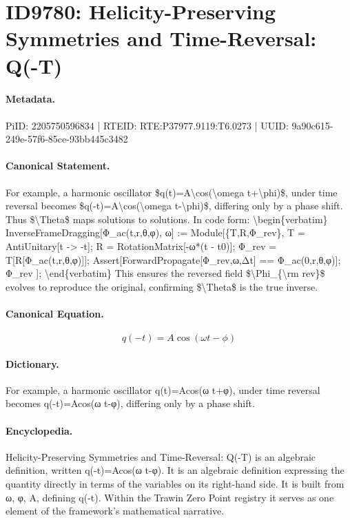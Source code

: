 \section*{ID9780: Helicity-Preserving Symmetries and Time-Reversal: Q(-T)}
\paragraph{Metadata.}
PiID: 2205750596834 | RTEID: RTE:P37977.9119:T6.0273 | UUID: 9a90c615-249e-57f6-85ce-93bb445c3482

\paragraph{Canonical Statement.}
For example, a harmonic oscillator \$q(t)=A\textbackslash{}cos(\textbackslash{}omega t+\textbackslash{}phi)\$, under time reversal becomes \$q(-t)=A\textbackslash{}cos(\textbackslash{}omega t-\textbackslash{}phi)\$, differing only by a phase shift. Thus \$\textbackslash{}Theta\$ maps solutions to solutions. In code form: \textbackslash{}begin\{verbatim\} InverseFrameDragging[Φ\_ac(t,r,θ,φ), ω] := Module[\{T,R,Φ\_rev\}, T = AntiUnitary[t -> -t]; R = RotationMatrix[-ω*(t - t0)]; Φ\_rev = T[R[Φ\_ac(t,r,θ,φ)]]; Assert[ForwardPropagate[Φ\_rev,ω,Δt] == Φ\_ac(0,r,θ,φ)]; Φ\_rev ]; \textbackslash{}end\{verbatim\} This ensures the reversed field \$\textbackslash{}Phi\_\{\textbackslash{}rm rev\}\$ evolves to reproduce the original, confirming \$\textbackslash{}Theta\$ is the true inverse.

\paragraph{Canonical Equation.}
\[
q(-t)=A\cos(\omega t-\phi)
\]

\paragraph{Dictionary.}
For example, a harmonic oscillator q(t)=Acos(ω t+φ), under time reversal becomes q(-t)=Acos(ω t-φ), differing only by a phase shift.

\paragraph{Encyclopedia.}
Helicity-Preserving Symmetries and Time-Reversal: Q(-T) is an algebraic definition, written q(-t)=Acos(ω t-φ). It is an algebraic definition expressing the quantity directly in terms of the variables on its right-hand side. It is built from ω, φ, A, defining q(-t). Within the Trawin Zero Point registry it serves as one element of the framework's mathematical narrative.
